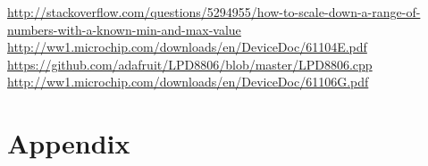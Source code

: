 \documentclass[11pt]{article}
\begin{document}
\pagebreak

\begin{thebibliography}{99}
\url{http://stackoverflow.com/questions/5294955/how-to-scale-down-a-range-of-numbers-with-a-known-min-and-max-value}
\url{http://ww1.microchip.com/downloads/en/DeviceDoc/61104E.pdf}
\url{https://github.com/adafruit/LPD8806/blob/master/LPD8806.cpp}
\url{http://ww1.microchip.com/downloads/en/DeviceDoc/61106G.pdf}
\end{thebibliography}

\appendix %

\section{Appendix}
\end{document}
